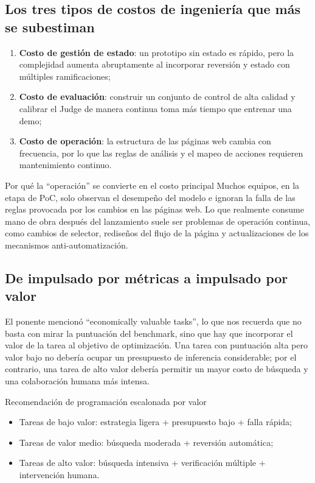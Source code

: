 \documentclass[a4paper]{article}
\begin{document}
\subsection{Los tres tipos de costos de ingeniería que más se subestiman}
\begin{enumerate}
    \item \textbf{Costo de gestión de estado}: un prototipo sin estado es rápido, pero la complejidad aumenta abruptamente al incorporar reversión y estado con múltiples ramificaciones;
    \item \textbf{Costo de evaluación}: construir un conjunto de control de alta calidad y calibrar el Judge de manera continua toma más tiempo que entrenar una demo;
    \item \textbf{Costo de operación}: la estructura de las páginas web cambia con frecuencia, por lo que las reglas de análisis y el mapeo de acciones requieren mantenimiento continuo.
\end{enumerate}

\begin{knowledgebox}{Por qué la ``operación'' se convierte en el costo principal}
Muchos equipos, en la etapa de PoC, solo observan el desempeño del modelo e ignoran la falla de las reglas provocada por los cambios en las páginas web. Lo que realmente consume mano de obra después del lanzamiento suele ser problemas de operación continua, como cambios de selector, rediseños del flujo de la página y actualizaciones de los mecanismos anti-automatización.
\end{knowledgebox}

\subsection{De impulsado por métricas a impulsado por valor}
El ponente mencionó ``economically valuable tasks'', lo que nos recuerda que no basta con mirar la puntuación del benchmark, sino que hay que incorporar el valor de la tarea al objetivo de optimización. Una tarea con puntuación alta pero valor bajo no debería ocupar un presupuesto de inferencia considerable; por el contrario, una tarea de alto valor debería permitir un mayor costo de búsqueda y una colaboración humana más intensa.

\begin{importantbox}{Recomendación de programación escalonada por valor}
\begin{itemize}
    \item Tareas de bajo valor: estrategia ligera + presupuesto bajo + falla rápida;
    \item Tareas de valor medio: búsqueda moderada + reversión automática;
    \item Tareas de alto valor: búsqueda intensiva + verificación múltiple + intervención humana.
\end{itemize}
\end{importantbox}
\end{document}
